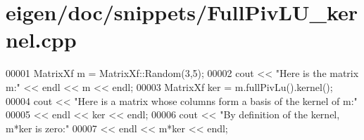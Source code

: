 \hypertarget{eigen_2doc_2snippets_2_full_piv_l_u__kernel_8cpp_source}{}\section{eigen/doc/snippets/\+Full\+Piv\+L\+U\+\_\+kernel.cpp}
\label{eigen_2doc_2snippets_2_full_piv_l_u__kernel_8cpp_source}

\begin{DoxyCode}
00001 MatrixXf m = MatrixXf::Random(3,5);
00002 cout << \textcolor{stringliteral}{"Here is the matrix m:"} << endl << m << endl;
00003 MatrixXf ker = m.fullPivLu().kernel();
00004 cout << \textcolor{stringliteral}{"Here is a matrix whose columns form a basis of the kernel of m:"}
00005      << endl << ker << endl;
00006 cout << \textcolor{stringliteral}{"By definition of the kernel, m*ker is zero:"}
00007      << endl << m*ker << endl;
\end{DoxyCode}
